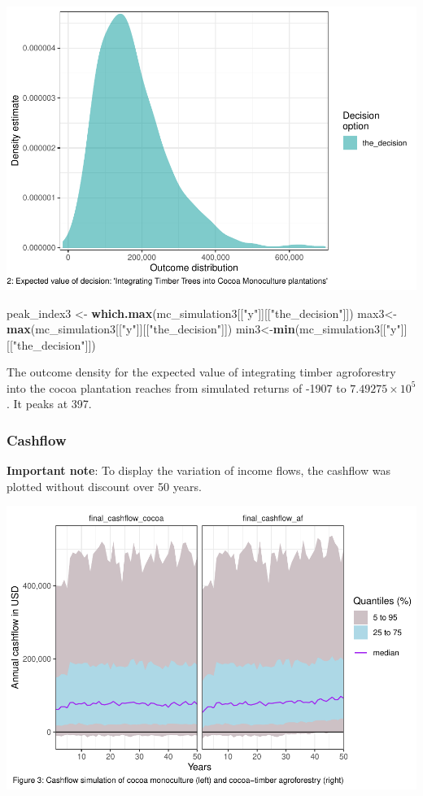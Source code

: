 \documentclass[
]{article}
\newenvironment{Shaded}{\begin{snugshade}}{\end{snugshade}}
\newcommand{\FunctionTok}[1]{\textcolor[rgb]{0.13,0.29,0.53}{\textbf{#1}}}
\newcommand{\NormalTok}[1]{#1}
\newcommand{\OtherTok}[1]{\textcolor[rgb]{0.56,0.35,0.01}{#1}}
\newcommand{\StringTok}[1]{\textcolor[rgb]{0.31,0.60,0.02}{#1}}
\begin{document}
\includegraphics{Report_files/figure-latex/decision value-1.pdf}

\begin{Shaded}
\begin{Highlighting}[]
\NormalTok{peak\_index3 }\OtherTok{\textless{}{-}} \FunctionTok{which.max}\NormalTok{(mc\_simulation3[[}\StringTok{"y"}\NormalTok{]][[}\StringTok{"the\_decision"}\NormalTok{]])}
\NormalTok{max3}\OtherTok{\textless{}{-}}\FunctionTok{max}\NormalTok{(mc\_simulation3[[}\StringTok{"y"}\NormalTok{]][[}\StringTok{"the\_decision"}\NormalTok{]])}
\NormalTok{min3}\OtherTok{\textless{}{-}}\FunctionTok{min}\NormalTok{(mc\_simulation3[[}\StringTok{"y"}\NormalTok{]][[}\StringTok{"the\_decision"}\NormalTok{]])}
\end{Highlighting}
\end{Shaded}

The outcome density for the expected value of integrating timber
agroforestry into the cocoa plantation reaches from simulated returns of
-1907 to \ensuremath{7.49275\times 10^{5}}. It peaks at 397.

\hypertarget{cashflow}{%
\subsubsection{Cashflow}\label{cashflow}}

\textbf{Important note}: To display the variation of income flows, the
cashflow was plotted without discount over 50 years.

\includegraphics{Report_files/figure-latex/cashflows undiscounted-1.pdf}
\end{document}

